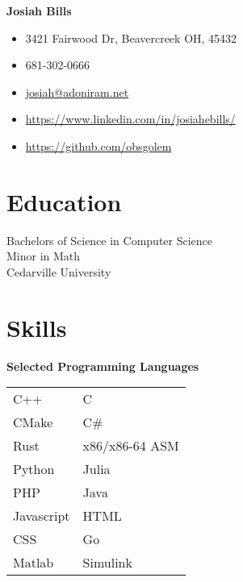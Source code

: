 \documentclass[10pt]{article}
\begin{document}
\begin{paracol}{2}
    \parbox[top][0.08\textheight][c]{\linewidth}{
        \textbf{\Huge{Josiah Bills}}
    }

    \switchcolumn

    \parbox[top][0.08\textheight][c]{\linewidth}{
        \begin{mdframed}[hidealllines=true,backgroundcolor=gray!20]
            \begin{itemize}[noitemsep]
                \item[] 3421 Fairwood Dr, Beavercreek OH, 45432
                \item[] 681-302-0666
                \item[] \href{mailto://Josiah@adoniram.net}{josiah@adoniram.net}
                \item[] \url{https://www.linkedin.com/in/josiahebills/}
                \item[] \url{https://github.com/obsgolem}
            \end{itemize}
        \end{mdframed}
    }

    \switchcolumn

    \section*{Education}
    \parbox[top][][c]{\linewidth}{
        Bachelors of Science in Computer Science \\
        Minor in Math \\
        Cedarville University
    }

    \section*{Skills}

    \parbox[top][][c]{\linewidth}{
        \begin{center}
            \textbf{Selected Programming Languages}
        \end{center}
        \begin{tabularx}{\linewidth}{YY}
            C++        & C              \\
            CMake      & C\#            \\
            Rust       & x86/x86-64 ASM \\
            Python     & Julia          \\
            PHP        & Java           \\
            Javascript & HTML           \\
            CSS        & Go             \\
            Matlab     & Simulink
        \end{tabularx}

}
\end{paracol}
\end{document}
